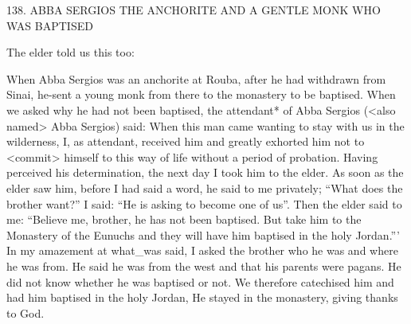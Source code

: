 138. ABBA SERGIOS THE ANCHORITE AND
A GENTLE MONK WHO WAS BAPTISED

The elder told us this too:

When Abba Sergios was an anchorite at Rouba, after he had
withdrawn from Sinai, he-sent a young monk from there to the
monastery to be baptised. When we asked why he had not been
baptised, the attendant* of Abba Sergios (<also named> Abba
Sergios) said: When this man came wanting to stay with us in the
wilderness, I, as attendant, received him and greatly exhorted him
not to <commit> himself to this way of life without a period of
probation. Having perceived his determination, the next day I took
him to the elder. As soon as the elder saw him, before I had said a
word, he said to me privately; “What does the brother want?” I
said: “He is asking to become one of us”. Then the elder said to me:
“Believe me, brother, he has not been baptised. But take him to the
Monastery of the Eunuchs and they will have him baptised in the
holy Jordan.”' In my amazement at what\_was said, I asked the
brother who he was and where he was from. He said he was from
the west and that his parents were pagans. He did not know
whether he was baptised or not. We therefore catechised him and
had him baptised in the holy Jordan, He stayed in the monastery,
giving thanks to God.

